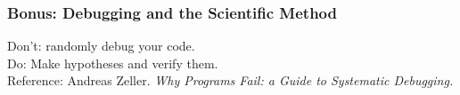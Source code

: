 \documentclass{beamer}
\newenvironment{changemargin}[1]{%
  \begin{list}{}{%
    \setlength{\topsep}{0pt}%
    \setlength{\leftmargin}{#1}%
    \setlength{\rightmargin}{1em}
    \setlength{\listparindent}{\parindent}%
    \setlength{\itemindent}{\parindent}%
    \setlength{\parsep}{\parskip}%
  }%
  \item[]}{\end{list}}
\begin{document}
\begin{frame}
\frametitle{Bonus: Debugging and the Scientific Method}
\Large
\begin{changemargin}{2em}
Don't: randomly debug your code.\\[1em]
Do: Make hypotheses and verify them.\\[2em]

Reference: Andreas Zeller. \emph{Why Programs Fail: a Guide to Systematic Debugging.}
\end{changemargin}
\end{frame}








\end{document}
